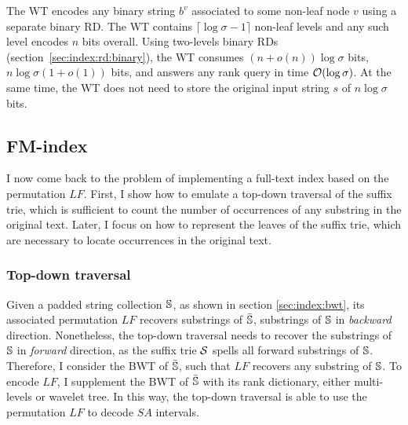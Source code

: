 The WT encodes any binary string $b^v$ associated to some non-leaf node $v$ using a separate binary RD.
The WT contains $\lceil \log \sigma - 1 \rceil$ non-leaf levels and any such level encodes $n$ bits overall.
Using two-levels binary RDs (section~\ref{sec:index:rd:binary}), the WT consumes $(n + o(n)) \log \sigma$ bits, \ie $n \log \sigma (1 + o(1))$ bits, and answers any rank query in time $\mathcal{O}(\log{\sigma})$.
At the same time, the WT does not need to store the original input string $s$ of $n \log \sigma$ bits.

\subsection{FM-index}
\label{sub:fmtrie}

I now come back to the problem of implementing a full-text index based on the permutation $LF$.
First, I show how to emulate a top-down traversal of the suffix trie, which is sufficient to count the number of occurrences of any substring in the original text.
Later, I focus on how to represent the leaves of the suffix trie, which are necessary to locate occurrences in the original text.

\subsubsection{Top-down traversal}

Given a padded string collection $\mathbb {S}$, as shown in section \ref{sec:index:bwt}, its associated permutation $LF$ recovers substrings of $\bar{\mathbb {S}}$, \ie substrings of $\mathbb {S}$ in \emph{backward} direction.
Nonetheless, the top-down traversal needs to recover the substrings of $\mathbb {S}$ in \emph{forward} direction, as the suffix trie $\mathcal {S}$ spells all forward substrings of $\mathbb {S}$.
Therefore, I consider the BWT of $\bar{\mathbb {S}}$, such that $LF$ recovers any substring of $\mathbb {S}$.
To encode $LF$, I supplement the BWT of $\bar{\mathbb {S}}$ with its rank dictionary, either multi-levels or wavelet tree.
In this way, the top-down traversal is able to use the permutation $LF$ to decode $SA$ intervals.

